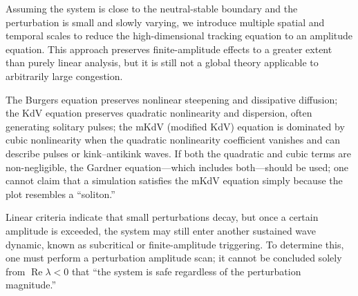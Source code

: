 \documentclass[11pt,a4paper,openany]{book}
\numberwithin{equation}{chapter}
\numberwithin{figure}{chapter}
\numberwithin{table}{chapter}
\begin{document}
\begin{description}[style=unboxed,leftmargin=0pt,labelindent=0pt,labelsep=0.5em,itemsep=0.65em,font=\normalfont\bfseries\color{navy}]
\item[Weakly nonlinear analysis（weakly nonlinear analysis）]







Assuming the system is close to the neutral-stable boundary and the perturbation is small and slowly varying, we introduce multiple spatial and temporal scales to reduce the high-dimensional tracking equation to an amplitude equation. This approach preserves finite-amplitude effects to a greater extent than purely linear analysis, but it is still not a global theory applicable to arbitrarily large congestion.





\item[Burgers, KdV, and mKdV equations]


The Burgers equation preserves nonlinear steepening and dissipative diffusion; the KdV equation preserves quadratic nonlinearity and dispersion, often generating solitary pulses; the mKdV (modified KdV) equation is dominated by cubic nonlinearity when the quadratic nonlinearity coefficient vanishes and can describe pulses or kink–antikink waves. If both the quadratic and cubic terms are non-negligible, the Gardner equation—which includes both—should be used; one cannot claim that a simulation satisfies the mKdV equation simply because the plot resembles a “soliton.”










\item[Subcritical / finite-amplitude instability]







Linear criteria indicate that small perturbations decay, but once a certain amplitude is exceeded, the system may still enter another sustained wave dynamic, known as subcritical or finite-amplitude triggering. To determine this, one must perform a perturbation amplitude scan; it cannot be concluded solely from $\operatorname{Re}\lambda<0$ that “the system is safe regardless of the perturbation magnitude.”







\end{description}
\end{document}
